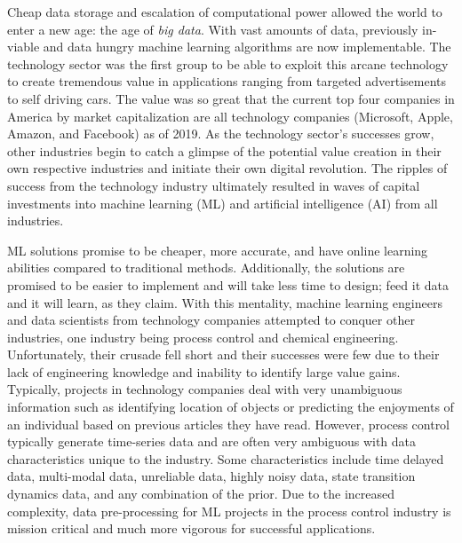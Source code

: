 %
% 

Cheap data storage and escalation of computational power allowed the world to enter a new age: the age of \textit{big data}. With vast amounts of data, previously in-viable and data hungry machine learning algorithms are now implementable.  The technology sector was the first group to be able to exploit this arcane technology to create tremendous value in applications ranging from targeted advertisements to self driving cars. The value was so great that the current top four companies in America by market capitalization are all technology companies (Microsoft, Apple, Amazon, and Facebook) as of 2019. As the technology sector's successes grow, other industries begin to catch a glimpse of the potential value creation in their own respective industries and initiate their own digital revolution. The ripples of success from the technology industry ultimately resulted in waves of capital investments into machine learning (ML) and artificial intelligence (AI) from all industries.

ML solutions promise to be cheaper, more accurate, and have online learning abilities compared to traditional methods.  Additionally, the solutions are promised to be easier to implement and will take less time to design; feed it data and it will learn, as they claim.  With this mentality, machine learning engineers and data scientists from technology companies attempted to conquer other industries, one industry being process control and chemical engineering. Unfortunately, their crusade fell short and their successes were few due to their lack of engineering knowledge and inability to identify large value gains.  Typically, projects in technology companies deal with very unambiguous information such as identifying location of objects or predicting the enjoyments of an individual based on previous articles they have read. However, process control typically generate time-series data and are often very ambiguous with data characteristics unique to the industry. Some characteristics include time delayed data, multi-modal data, unreliable data, highly noisy data, state transition dynamics data, and any combination of the prior.  Due to the increased complexity, data pre-processing for ML projects in the process control industry is mission critical and much more vigorous for successful applications.

